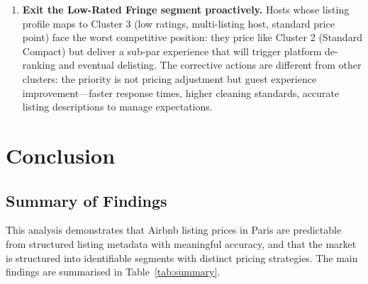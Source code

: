 \documentclass[12pt, a4paper]{article}
\begin{document}
\begin{enumerate}[leftmargin=2em, itemsep=8pt]
  \item \textbf{Exit the Low-Rated Fringe segment proactively.}
  Hosts whose listing profile maps to Cluster 3 (low ratings, multi-listing host, standard price point) face the worst competitive position: they price like Cluster 2 (Standard Compact) but deliver a sub-par experience that will trigger platform de-ranking and eventual delisting. The corrective actions are different from other clusters: the priority is not pricing adjustment but guest experience improvement---faster response times, higher cleaning standards, accurate listing descriptions to manage expectations.

\end{enumerate}

\section{Conclusion}
\label{sec:conclusion}

\subsection{Summary of Findings}

This analysis demonstrates that Airbnb listing prices in Paris are predictable from structured listing metadata with meaningful accuracy, and that the market is structured into identifiable segments with distinct pricing strategies. The main findings are summarised in Table~\ref{tab:summary}.
\end{document}
